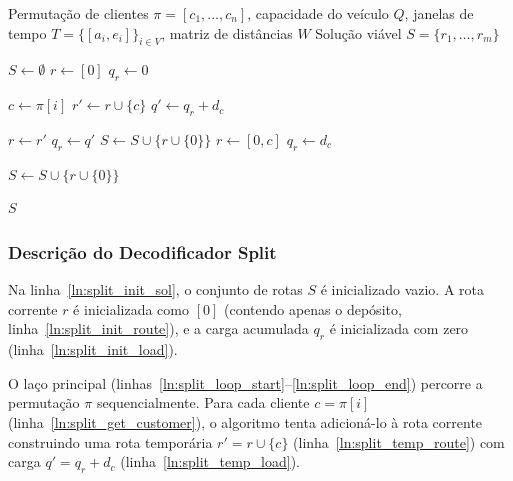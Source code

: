 \begin{algorithm}[H]
\caption{Decodificador Split Guloso}
\label{alg:split}
\begin{algorithmic}[1]
\Require Permutação de clientes $\pi = [c_1, \ldots, c_n]$, capacidade do veículo $Q$, janelas de tempo $T = \{[a_i, e_i]\}_{i \in V}$, matriz de distâncias $W$
\Ensure Solução viável $S = \{r_1, \ldots, r_m\}$

    \State $S \leftarrow \emptyset$ \label{ln:split_init_sol}
    \State $r \leftarrow [0]$ \label{ln:split_init_route}
    \State $q_r \leftarrow 0$ \label{ln:split_init_load}
    
     \label{ln:split_loop_start}
        \State $c \leftarrow \pi[i]$ \label{ln:split_get_customer}
        \State $r' \leftarrow r \cup \{c\}$ \label{ln:split_temp_route}
        \State $q' \leftarrow q_r + d_c$ \label{ln:split_temp_load}
        
         \label{ln:split_check_feasible}
            \State $r \leftarrow r'$ \label{ln:split_accept}
            \State $q_r \leftarrow q'$ \label{ln:split_update_load}
        \Else \label{ln:split_else}
             \label{ln:split_check_nonempty}
                \State $S \leftarrow S \cup \{r \cup \{0\}\}$ \label{ln:split_close_route}
            \EndIf
            \State $r \leftarrow [0, c]$ \label{ln:split_new_route}
            \State $q_r \leftarrow d_c$ \label{ln:split_new_load}
        \EndIf
    \EndFor \label{ln:split_loop_end}
    
     \label{ln:split_final_check}
        \State $S \leftarrow S \cup \{r \cup \{0\}\}$ \label{ln:split_final_close}
    \EndIf
    
    \State \Return $S$ \label{ln:split_return}
\end{algorithmic}
\end{algorithm}

\subsubsection{Descrição do Decodificador Split}

Na linha~\ref{ln:split_init_sol}, o conjunto de rotas $S$ é inicializado vazio. A rota corrente $r$ é inicializada como $[0]$ (contendo apenas o depósito, linha~\ref{ln:split_init_route}), e a carga acumulada $q_r$ é inicializada com zero (linha~\ref{ln:split_init_load}).

O laço principal (linhas~\ref{ln:split_loop_start}--\ref{ln:split_loop_end}) percorre a permutação $\pi$ sequencialmente. Para cada cliente $c = \pi[i]$ (linha~\ref{ln:split_get_customer}), o algoritmo tenta adicioná-lo à rota corrente construindo uma rota temporária $r' = r \cup \{c\}$ (linha~\ref{ln:split_temp_route}) com carga $q' = q_r + d_c$ (linha~\ref{ln:split_temp_load}).

